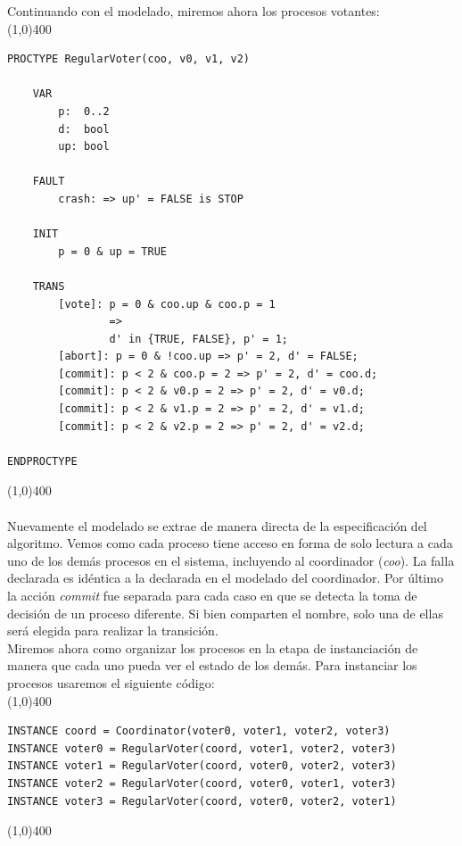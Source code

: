 \documentclass[titlepage, 12pt]{book}
\begin{document}
Continuando con el modelado, miremos ahora los procesos votantes:\\

\noindent \line(1,0){400}
\begin{verbatim}
PROCTYPE RegularVoter(coo, v0, v1, v2)
    
    VAR
        p:  0..2
        d:  bool
        up: bool

    FAULT
        crash: => up' = FALSE is STOP
    
    INIT
        p = 0 & up = TRUE

    TRANS
        [vote]: p = 0 & coo.up & coo.p = 1
                => 
                d' in {TRUE, FALSE}, p' = 1;
        [abort]: p = 0 & !coo.up => p' = 2, d' = FALSE;
        [commit]: p < 2 & coo.p = 2 => p' = 2, d' = coo.d;
        [commit]: p < 2 & v0.p = 2 => p' = 2, d' = v0.d;
        [commit]: p < 2 & v1.p = 2 => p' = 2, d' = v1.d;
        [commit]: p < 2 & v2.p = 2 => p' = 2, d' = v2.d;

ENDPROCTYPE
\end{verbatim}
\line(1,0){400}
~\\\\


Nuevamente el modelado se extrae de manera directa de la especificaci\'on del algoritmo. Vemos como cada proceso tiene acceso en forma de solo lectura a cada uno de los dem\'as procesos en el sistema, incluyendo al coordinador (\textit{coo}). La falla declarada es id\'entica a la declarada en el modelado del coordinador. Por \'ultimo la acci\'on \textit{commit} fue separada para cada caso en que se detecta la toma de decisi\'on de un proceso diferente. Si bien comparten el nombre, solo una de ellas ser\'a elegida para realizar la transici\'on.\\

Miremos ahora como organizar los procesos en la etapa de instanciaci\'on de manera que cada uno pueda ver el estado de los dem\'as. Para instanciar los procesos usaremos el siguiente c\'odigo:\\

\noindent \line(1,0){400}
\begin{verbatim}
INSTANCE coord = Coordinator(voter0, voter1, voter2, voter3)
INSTANCE voter0 = RegularVoter(coord, voter1, voter2, voter3)
INSTANCE voter1 = RegularVoter(coord, voter0, voter2, voter3)
INSTANCE voter2 = RegularVoter(coord, voter0, voter1, voter3)
INSTANCE voter3 = RegularVoter(coord, voter0, voter2, voter1)
\end{verbatim}
\noindent \line(1,0){400}
~\\\\
\end{document}
